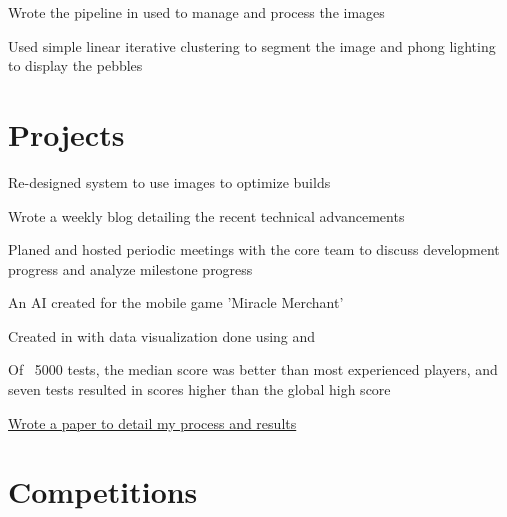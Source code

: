 \documentclass[]{deedy-resume-openfont}
\begin{document}
\begin{minipage}[t]{0.66\textwidth}
\begin{tightemize}
\item Wrote the pipeline in used to manage and process the images

\item Used simple linear iterative clustering to segment the image and phong lighting to display the pebbles

\end{tightemize}
\sectionsep

\section{Projects}

\begin{tightemize}

\item Re-designed system to use images to optimize builds

\item Wrote a weekly blog detailing the recent technical advancements

\item Planed and hosted periodic meetings with the core team to discuss development progress and analyze milestone progress

\end{tightemize}
\sectionsep
{}
\begin{tightemize}

\item An AI created for the mobile game 'Miracle Merchant'

\item Created in with data visualization done using and 

\item Of ~5000 tests, the median score was better than most experienced players, and seven tests resulted in scores higher than the global high score

\item \href{https://github.com/AngelOnFira/Miracle-Merchant-AI/blob/master/Miracle_Merchant.pdf}{Wrote a paper to detail my process and results}

\end{tightemize}
\sectionsep

\section{Competitions}


\end{minipage}
\end{document}
